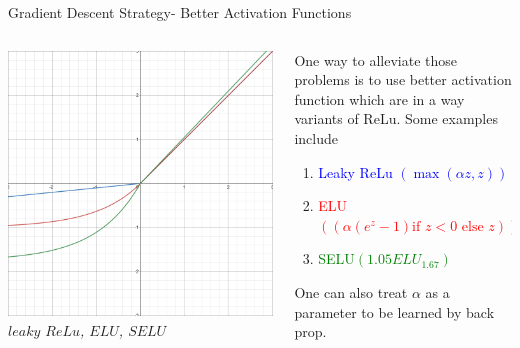 \begin{frame}{Gradient Descent Strategy- Better Activation Functions}
	\begin{columns}[T]
        \begin{column}{0.5\textwidth}
        	\includegraphics[width=\textwidth]{images/SELU.png}
        	\tiny{\textit{$leaky$ $ReLu$, $ELU$, $SELU$}}
        \end{column}
	    \begin{column}{0.5\textwidth}
    	    One way to alleviate those problems is to use better activation function which are in a way variants of ReLu. Some examples include 
			\begin{enumerate}[$\bullet$]
				\item \textcolor{blue}{Leaky ReLu $\left(\max(\alpha z,z)\right)$}
				\item \textcolor{red}{ELU$\left((\alpha (e^z-1)\text{if $z<0$ else }z)\right)$} 
				\item \textcolor{green}{SELU$\left(1.05ELU_{1.67}\right)$}
			\end{enumerate}
			One can also treat $\alpha$ as a parameter to be learned by back prop. 
    	\end{column}
    \end{columns}
\end{frame}

